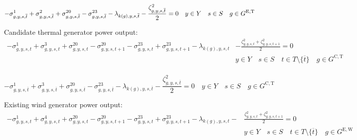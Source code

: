 \documentclass{article}
\newcommand{\sGeneratorsExistingThermal}{G^{\mathrm{E,T}}}
\newcommand{\sGeneratorsExistingWind}{G^{\mathrm{E,W}}}
\newcommand{\sGeneratorsCandidateThermal}{G^{\mathrm{C,T}}}
\newcommand{\sYears}{Y}
\newcommand{\sScenarios}{S}
\newcommand{\sIntervals}{T}
\newcommand{\iGenerator}{g}
\newcommand{\iYear}{y}
\newcommand{\iScenario}{s}
\newcommand{\iInterval}{t}
\newcommand{\iIntervalTerminal}{\overline{\iInterval}}
\newcommand{\iZone}{z}
\newcommand{\dMinPowerOutput}[1][\iGenerator,\iYear,\iScenario,\iInterval]{\sigma_{#1}^{1}}
\newcommand{\dMaxPowerOutputExistingThermal}[1][\iGenerator,\iYear,\iScenario,\iInterval]{\sigma_{#1}^{2}}
\newcommand{\dMaxPowerOutputCandidateThermal}[1][\iGenerator,\iYear,\iScenario,\iInterval]{\sigma_{#1}^{3}}
\newcommand{\dMaxPowerOutputWindExisting}[1][\iGenerator,\iYear,\iScenario,\iInterval]{\sigma_{#1}^{4}}
\newcommand{\dRampRateUp}[1][\iGenerator,\iYear,\iScenario,\iInterval]{\sigma_{#1}^{20}}
\newcommand{\dRampRateDown}[1][\iGenerator,\iYear,\iScenario,\iInterval]{\sigma_{#1}^{23}}
\newcommand{\dPowerBalance}[1][\iZone,\iYear,\iScenario,\iInterval]{\lambda_{#1}}
\newcommand{\dGeneratorEnergyOutput}[1][\iGenerator,\iYear,\iScenario,\iInterval]{\zeta_{#1}^{2}}
\begin{document}
\begin{equation}
-\dMinPowerOutput[\iGenerator,\iYear,\iScenario,\iIntervalTerminal] + \dMaxPowerOutputExistingThermal[\iGenerator,\iYear,\iScenario,\iIntervalTerminal] + \dRampRateUp[\iGenerator,\iYear,\iScenario,\iIntervalTerminal] - \dRampRateDown[\iGenerator,\iYear,\iScenario,\iIntervalTerminal] - \dPowerBalance[k(\iGenerator),\iYear,\iScenario,\iIntervalTerminal] - \frac{\dGeneratorEnergyOutput[\iGenerator,\iYear,\iScenario,\iIntervalTerminal]}{2} = 0 \quad \iYear \in \sYears \quad \iScenario \in \sScenarios \quad \iGenerator \in \sGeneratorsExistingThermal\\
\end{equation}

Candidate thermal generator power output:
\begin{align}
-\dMinPowerOutput + \dMaxPowerOutputCandidateThermal + \dRampRateUp - \dRampRateUp[\iGenerator,\iYear,\iScenario,\iInterval+1] - \dRampRateDown + \dRampRateDown[\iGenerator,\iYear,\iScenario,\iInterval+1] - \dPowerBalance[k(\iGenerator),\iYear,\iScenario,\iInterval] & - \frac{\dGeneratorEnergyOutput + \dGeneratorEnergyOutput[\iGenerator,\iYear,\iScenario,\iInterval+1]}{2} = 0\\\nonumber
& \iYear \in \sYears \quad \iScenario \in \sScenarios \quad \iInterval \in \sIntervals \setminus \{\iIntervalTerminal\} \quad \iGenerator \in \sGeneratorsCandidateThermal\\\nonumber
\end{align}

\begin{equation}
-\dMinPowerOutput[\iGenerator,\iYear,\iScenario,\iIntervalTerminal] + \dMaxPowerOutputCandidateThermal[\iGenerator,\iYear,\iScenario,\iIntervalTerminal] + \dRampRateUp[\iGenerator,\iYear,\iScenario,\iIntervalTerminal] - \dRampRateDown[\iGenerator,\iYear,\iScenario,\iIntervalTerminal] - \dPowerBalance[k(\iGenerator),\iYear,\iScenario,\iIntervalTerminal] - \frac{\dGeneratorEnergyOutput[\iGenerator,\iYear,\iScenario,\iIntervalTerminal]}{2} = 0 \quad \iYear \in \sYears \quad \iScenario \in \sScenarios \quad \iGenerator \in \sGeneratorsCandidateThermal
\end{equation}

Existing wind generator power output:
\begin{align}
-\dMinPowerOutput + \dMaxPowerOutputWindExisting + \dRampRateUp - \dRampRateUp[\iGenerator,\iYear,\iScenario,\iInterval+1] - \dRampRateDown + \dRampRateDown[\iGenerator,\iYear,\iScenario,\iInterval+1] - \dPowerBalance[k(\iGenerator),\iYear,\iScenario,\iInterval] - & \frac{\dGeneratorEnergyOutput + \dGeneratorEnergyOutput[\iGenerator,\iYear,\iScenario,\iInterval+1]}{2} = 0 \\\nonumber
& \iYear \in \sYears \quad \iScenario \in \sScenarios \quad \iInterval \in \sIntervals \setminus \{\iIntervalTerminal\} \quad \iGenerator \in \sGeneratorsExistingWind\\\nonumber
\end{align}
\end{document}
